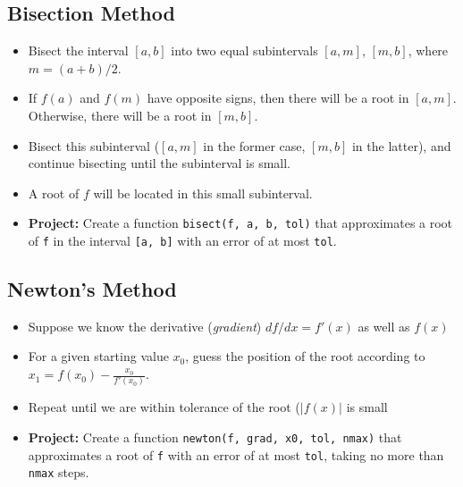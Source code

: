 \documentclass[]{tufte-handout}
\providecommand{\tightlist}{%
  \setlength{\itemsep}{0pt}\setlength{\parskip}{0pt}}
\begin{document}
\subsection{Bisection Method}\label{bisection-method}

\begin{itemize}
\tightlist
\item
  Bisect the interval \([a, b]\) into two equal subintervals \([a, m]\),
  \([m, b]\), where \(m = (a + b)/2\).
\item
  If \(f(a)\) and \(f(m)\) have opposite signs, then there will be a
  root in \([a, m]\). Otherwise, there will be a root in \([m, b]\).
\item
  Bisect this subinterval (\([a, m]\) in the former case, \([m, b]\) in
  the latter), and continue bisecting until the subinterval is small.
\item
  A root of \(f\) will be located in this small subinterval.
\item
  \textbf{Project:} Create a function \texttt{bisect(f,\ a,\ b,\ tol)}
  that approximates a root of \texttt{f} in the interval
  \texttt{{[}a,\ b{]}} with an error of at most \texttt{tol}.
\end{itemize}

\subsection{Newton's Method}\label{newtons-method}

\begin{itemize}
\tightlist
\item
  Suppose we know the derivative (\emph{gradient}) \(df/dx=f'(x)\) as
  well as \(f(x)\)
\item
  For a given starting value \(x_0\), guess the position of the root
  according to \(x_1 = f(x_0)-\frac{x_0}{f'(x_0)}\).
\item
  Repeat until we are within tolerance of the root (\(|f(x)|\) is small
\item
  \textbf{Project:} Create a function
  \texttt{newton(f,\ grad,\ x0,\ tol,\ nmax)} that approximates a root
  of \texttt{f} with an error of at most \texttt{tol}, taking no more
  than \texttt{nmax} steps.
\end{itemize}
\end{document}
